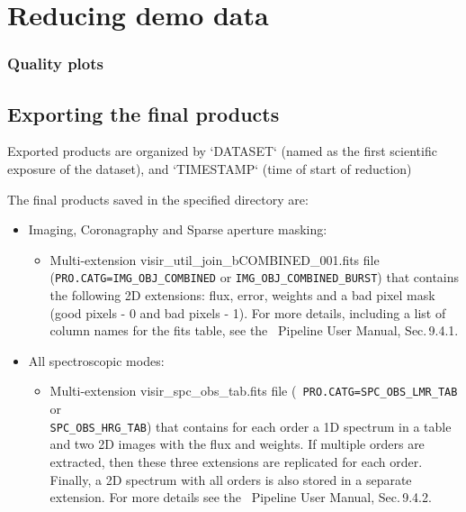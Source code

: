 
\section{Reducing demo data}
\label{sec:reducing_demo_data}



 
\subsubsection{Quality plots}


\subsection{Exporting the final products}
\label{sec:export_final_products}



 
 
Exported products are organized by `DATASET` (named as the first
scientific exposure of the dataset), and `TIMESTAMP` (time of start 
of reduction)

The final products saved in the specified directory are: 
\begin{itemize}

\item Imaging, Coronagraphy and Sparse aperture masking: 
\begin{itemize}
\item Multi-extension visir\_util\_join\_bCOMBINED\_001.fits file 
({\tt PRO.CATG=IMG\_OBJ\_COMBINED} or {\tt IMG\_OBJ\_COMBINED\_BURST}) 
that contains the following 2D extensions: flux, error, weights and a 
bad pixel mask (good pixels - 0 and bad pixels - 1). For more details, 
including a list of column names for the fits table, see the 
\instname\ Pipeline User Manual, Sec.\,9.4.1.
\end{itemize}

\item All spectroscopic modes: 
\begin{itemize}
\item Multi-extension visir\_spc\_obs\_tab.fits file ({\tt 
PRO.CATG=SPC\_OBS\_LMR\_TAB} or\\ {\tt SPC\_OBS\_HRG\_TAB}) that contains 
for each order a 1D spectrum in a table and two 2D images with the flux 
and weights. If multiple orders are extracted, then these three 
extensions are replicated for each order. Finally, a 2D spectrum with 
all orders is also stored in a separate extension. For more details
see the \instname\ Pipeline User Manual, Sec.\,9.4.2.
\end{itemize}

\end{itemize}
